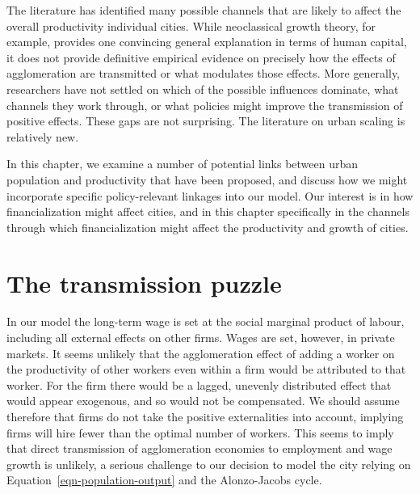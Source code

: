  The literature has identified many possible channels that are likely to affect the overall productivity individual cities. 
 While neoclassical growth theory, for example, provides one convincing general explanation in terms of human capital, it does not provide definitive empirical evidence on precisely how the effects of agglomeration are transmitted or what modulates those effects. More generally, researchers have not settled on which  of the possible influences dominate, what channels they work through, or what policies might improve the transmission of positive effects. These gaps are  not surprising. The literature on urban scaling is relatively new.  

  In this chapter, we examine a number of potential  links between urban population and productivity that have been proposed, and discuss how we  might incorporate specific policy-relevant linkages into our model.  Our interest is in how financialization might affect cities, and in this chapter specifically in the channels through which financialization might affect the productivity and growth of cities.



\section{The transmission puzzle}
 In our model the long-term wage is set at the social marginal product of labour, including all external effects on other firms. Wages are set, however, in private markets. It seems unlikely that the agglomeration effect of adding a worker on the productivity of other workers even within a firm  would be attributed to that worker. For the firm there  would be a lagged, unevenly distributed effect that would appear exogenous, and so would not be compensated. 
 We should  assume therefore that firms do not take the positive externalities into account, implying firms will hire fewer than the optimal number of workers. 
 This seems to imply that direct transmission of agglomeration economies to employment and wage growth is unlikely,  a serious challenge to our decision to model the city relying on Equation~\ref{eqn-population-output} and the  Alonzo-Jacobs cycle.

